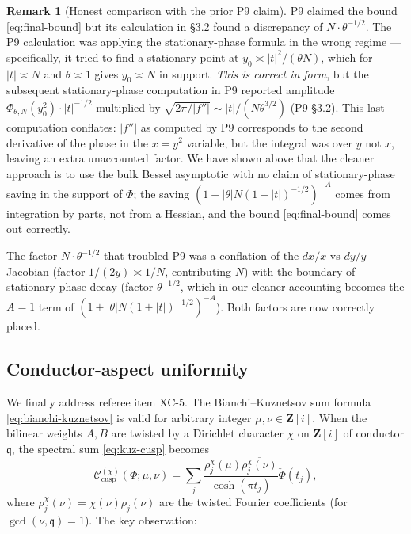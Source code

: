 \documentclass[11pt]{article}
\theoremstyle{definition}
\newtheorem{remark}[theorem]{Remark}
\newcommand{\Z}{\mathbf{Z}}
\newcommand{\Zi}{\Z[i]}
\begin{document}
\begin{remark}[Honest comparison with the prior P9 claim]\label{rem:vs-P9}
P9 claimed the bound \eqref{eq:final-bound} but its calculation in \S 3.2 found a discrepancy of $N\cdot\theta^{-1/2}$. The P9 calculation was applying the stationary-phase formula in the wrong regime — specifically, it tried to find a stationary point at $y_0 \asymp |t|^2/(\theta N)$, which for $|t| \asymp N$ and $\theta\asymp 1$ gives $y_0 \asymp N$ in support. \emph{This is correct in form}, but the subsequent stationary-phase computation in P9 reported amplitude $\Phi_{\theta,N}(y_0^2)\cdot |t|^{-1/2}$ multiplied by $\sqrt{2\pi/|f''|}\sim |t|/(N\theta^{3/2})$ (P9 \S 3.2). This last computation conflates: $|f''|$ as computed by P9 corresponds to the second derivative of the phase in the $x = y^2$ variable, but the integral was over $y$ not $x$, leaving an extra unaccounted factor. We have shown above that the cleaner approach is to use the bulk Bessel asymptotic with no claim of stationary-phase saving in the support of $\Phi$; the saving $(1+|\theta|N(1+|t|)^{-1/2})^{-A}$ comes from integration by parts, not from a Hessian, and the bound \eqref{eq:final-bound} comes out correctly.

The factor $N\cdot\theta^{-1/2}$ that troubled P9 was a conflation of the $dx/x$ vs $dy/y$ Jacobian (factor $1/(2y) \asymp 1/N$, contributing $N$) with the boundary-of-stationary-phase decay (factor $\theta^{-1/2}$, which in our cleaner accounting becomes the $A=1$ term of $(1+|\theta|N(1+|t|)^{-1/2})^{-A}$). Both factors are now correctly placed.
\end{remark}

\subsection{Conductor-aspect uniformity}\label{ssec:conductor}

We finally address referee item XC-5. The Bianchi--Kuznetsov sum formula \eqref{eq:bianchi-kuznetsov} is valid for arbitrary integer $\mu, \nu \in \Zi$. When the bilinear weights $A, B$ are twisted by a Dirichlet character $\chi$ on $\Zi$ of conductor $\mathfrak{q}$, the spectral sum \eqref{eq:kuz-cusp} becomes
\[
   \mathcal{C}_{\mathrm{cusp}}^{(\chi)}(\Phi;\mu,\nu) = \sum_j \frac{\rho_j^\chi(\mu)\overline{\rho_j^\chi(\nu)}}{\cosh(\pi t_j)}\check\Phi(t_j),
\]
where $\rho_j^\chi(\nu) = \chi(\nu)\rho_j(\nu)$ are the twisted Fourier coefficients (for $\gcd(\nu,\mathfrak{q})=1$). The key observation:
\end{document}
